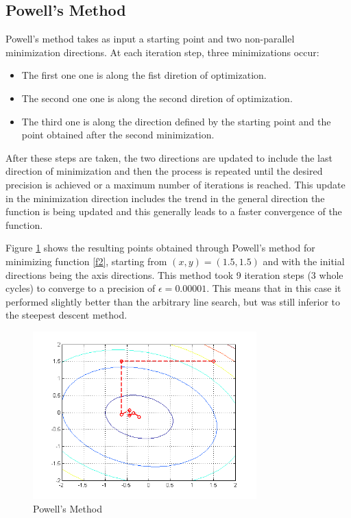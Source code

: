 \documentclass[journal]{IEEEtran}
\begin{document}
\subsection{Powell's Method}

Powell's method takes as input a starting point and two non-parallel minimization directions. At each iteration step, three minimizations occur:

\begin{itemize}
    \item The first one one is along the fist diretion of optimization.
    \item The second one one is along the second diretion of optimization.
    \item The third one is along the direction defined by the starting point and the point obtained after the second minimization.
\end{itemize}

After these steps are taken, the two directions are updated to include the last direction of minimization and then the process is repeated until the desired precision is achieved or a maximum number of iterations is reached. This update in the minimization direction includes the trend in the general direction the function is being updated and this generally leads to a faster convergence of the function.

Figure \ref{figPM} shows the resulting points obtained through Powell's method for minimizing function \ref{f2}, starting from $(x,y) = (1.5,1.5)$ and with the initial directions being the axis directions. This method took 9 iteration steps (3 whole cycles) to converge to a precision of $\epsilon = 0.00001$. This means that in this case it performed slightly better than the arbitrary line search, but was still inferior to the steepest descent method.

\begin{figure}[H]
\centering
\includegraphics[width=3.4in]{figures/2d-powellsMethod.png}
\caption{Powell's Method}
\label{figPM}
\end{figure}
\end{document}
